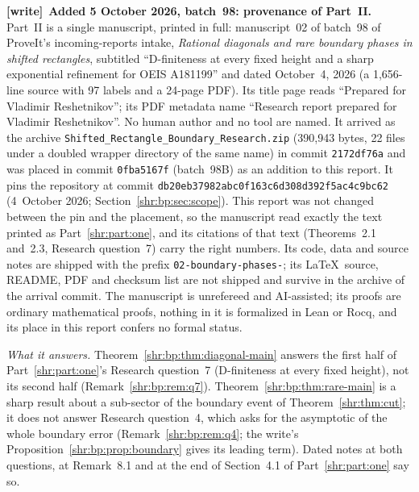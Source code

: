 \documentclass[11pt,letterpaper]{article}
\numberwithin{equation}{section}
\theoremstyle{definition}
\newcommand{\1}{\mathbf 1}
\newenvironment{writenote}[1][]{\par\smallskip\begingroup\small
 \noindent\textbf{[write]}\if\relax\detokenize{#1}\relax\else~\textbf{#1.}\fi\ }%
 {\par\endgroup\smallskip}
\begin{document}
\begin{writenote}[Added 5 October 2026, batch~98: provenance of Part~II]
Part~II is a single manuscript, printed in full: manuscript~02 of batch~98
of ProveIt's incoming-reports intake, \emph{Rational diagonals and rare
boundary phases in shifted rectangles}, subtitled ``D-finiteness at every
fixed height and a sharp exponential refinement for OEIS A181199'' and
dated October~4, 2026 (a 1{,}656-line source with 97 labels and a 24-page
PDF). Its title page reads ``Prepared for Vladimir Reshetnikov''; its PDF
metadata name ``Research report prepared for Vladimir Reshetnikov''. No
human author and no tool are named. It arrived as the archive
\texttt{Shifted\_\allowbreak Rectangle\_\allowbreak Boundary\_\allowbreak Research.zip}
(390{,}943 bytes, 22 files under a doubled wrapper directory of the same
name) in commit \texttt{2172df76a} and was placed in commit
\texttt{0fba5167f} (batch~98B) as an addition to this report. It pins the
repository at commit \texttt{db20eb37982abc0f163c6d308d392f5ac4c9bc62}
(4~October 2026; Section~\ref{shr:bp:sec:scope}). This report was not
changed between the pin and the placement, so the manuscript read exactly
the text printed as Part~\ref{shr:part:one}, and its citations of that text
(Theorems~2.1 and~2.3, Research question~7) carry the right numbers. Its
code, data and source notes are shipped with the prefix
\texttt{02-boundary-phases-}; its \LaTeX\ source, README, PDF and checksum
list are not shipped and survive in the archive of the arrival commit. The
manuscript is unrefereed and AI-assisted; its proofs are ordinary
mathematical proofs, nothing in it is formalized in Lean or Rocq, and its
place in this report confers no formal status.

\emph{What it answers.} Theorem~\ref{shr:bp:thm:diagonal-main} answers the
first half of Part~\ref{shr:part:one}'s Research question~7 (D-finiteness
at every fixed height), not its second half (Remark~\ref{shr:bp:rem:q7}).
Theorem~\ref{shr:bp:thm:rare-main} is a sharp result about a sub-sector of
the boundary event of Theorem~\ref{shr:thm:cut}; it does not answer
Research question~4, which asks for the asymptotic of the whole boundary
error (Remark~\ref{shr:bp:rem:q4}; the write's
Proposition~\ref{shr:bp:prop:boundary} gives its leading term). Dated notes
at both questions, at Remark~8.1 and at the end of Section~4.1 of
Part~\ref{shr:part:one} say so.


\end{writenote}
\end{document}

